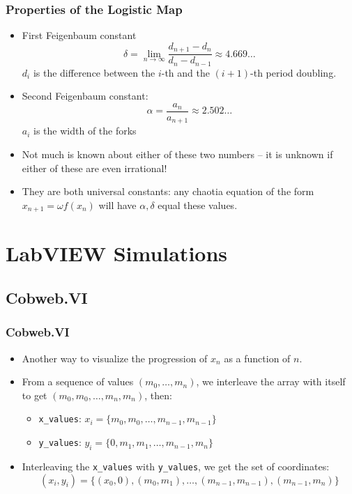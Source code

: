 \documentclass[9pt]{beamer}
\begin{document}
\begin{frame}
	\frametitle{Properties of the Logistic Map}

	\begin{itemize}
		\item First Feigenbaum constant
			\[
				\delta = \lim_{n \to \infty}\frac{d_{n + 1} - d_n}{d_n - d_{n - 1}}
				\approx 4.669\dots
			\]
			\( d_i \) is the difference between the \( i \)-th and the \( (i + 1)
			\)-th period doubling.
			\pause 
		\item Second Feigenbaum constant:
			\[
				\alpha = \frac{a_n}{a_{n + 1}} \approx 2.502\dots
			\]
			\( a_i \) is the width of the forks 
		\item Not much is known about either of these two numbers -- it is unknown if
			either of these are even irrational! 
		\item They are both universal constants: any chaotia equation of the form \(
			x_{n + 1} = \omega f(x_n) \) will have \( \alpha, \delta \) equal these
			values. 
	\end{itemize}
\end{frame}

\section{LabVIEW Simulations}

\subsection{Cobweb.VI}
\begin{frame}
	\frametitle{Cobweb.VI}

	\begin{itemize}
		\item Another way to visualize the progression of \( x_n \) as a function of
			\( n \). 
		\item From a sequence of values \( (m_0, \dots, m_n) \), we interleave the
			array with itself to get \( (m_0, m_0, \dots, m_n, m_n) \), then:
			\begin{itemize}
				\item \texttt{x\_values}: \( x_i = \{m_0, m_0, \dots, m_{n - 1}, m_{n
					- 1}\} \) 
				\item \texttt{y\_values}: \( y_i = \{0, m_1, m_1, \dots, m_{n - 1},
					m_n \}\)
			\end{itemize}
		\item Interleaving the \texttt{x\_values} with \texttt{y\_values}, we get the
			set of coordinates:
			\[
				(x_i, y_i) = \{(x_0, 0), (m_0, m_1), \dots, (m_{n - 1}, m_{n - 1}),
				(m_{n -1}, m_n)\}
			\]
	\end{itemize}
\end{frame}
\end{document}
